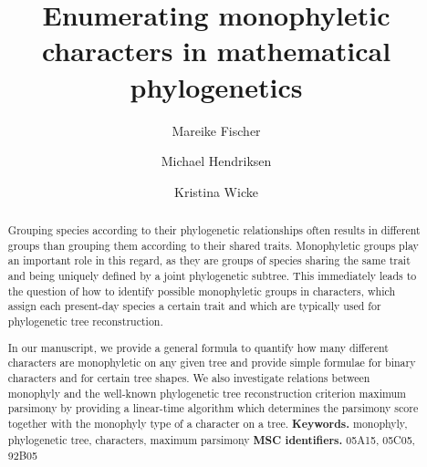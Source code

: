 \documentclass{amsart}
\title[Enumerating monophyletic characters]{Enumerating monophyletic characters in mathematical phylogenetics}
\author[Fischer]{Mareike Fischer}
\author[Hendriksen]{Michael Hendriksen}
\author[Wicke]{Kristina Wicke}
\theoremstyle{definition}
\begin{document}

\begin{abstract} 
Grouping species according to their phylogenetic relationships often results in different groups than grouping them according to their shared traits. Monophyletic groups play an important role in this regard, as they are groups of species sharing the same trait and being uniquely defined by a joint phylogenetic subtree. This immediately leads to the question of how to identify possible monophyletic groups in characters, which assign each present-day species a certain trait and which are typically used for phylogenetic tree reconstruction.

In our manuscript, we provide a general formula to quantify how many different characters are monophyletic on any given tree and provide simple formulae for binary characters and for certain tree shapes. We also investigate relations between monophyly and the well-known phylogenetic tree reconstruction criterion maximum parsimony by providing a linear-time algorithm which determines the parsimony score together with the monophyly type of a character on a tree.
 \smallskip \newline
\noindent \textbf{Keywords.} 
monophyly, phylogenetic tree, characters, maximum parsimony
\smallskip \newline
\noindent \textbf{MSC identifiers.} 05A15, 05C05, 92B05
\end{abstract}

\maketitle
\end{document}
